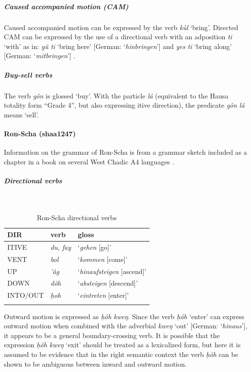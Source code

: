 \subparagraph{Caused accompanied motion (CAM)}



Caused accompanied motion can be expressed by the verb \textit{kùl} `bring'. Directed CAM can be expressed by the use of a directional verb with an adposition \textit{ti} `with' as in: \textit{yû ti} `bring here' [German: `\textit{hinbringen}'] and \textit{yes ti} `bring along' [German: `\textit{mitbringen}'] \citep[43]{seibertRonDaffoJosPlateau1998}. 

\subparagraph{Buy-sell verbs}



The verb \textit{gôn} is glossed `buy'. With the particle \textit{lá} (equivalent to the Hausa totality form ``Grade 4'', but also expressing itive direction), the predicate \textit{gôn lá} means `sell'. 

\paragraph*{Ron-Scha (shaa1247)} \label{shaa}

Information on the grammar of Ron-Scha is from a grammar sketch included as a chapter in a book on several West Chadic A4 languages \citep{jungraithmayrRonSprachenTaschadohamitischeStudien1970}.

\subparagraph{Directional verbs}~



\begin{table}[H]
	\caption{Ron-Scha directional verbs} 
	\label{tab:shaaV}
	\begin{tabular}{lll} %
		\lsptoprule
		DIR & verb & gloss   \\ %
		\midrule
		ITIVE & \textit{du, fay} & `\textit{gehen} [go]' \\
		VENT & \textit{bol} & `\textit{kommen} [come]' \\
		UP & \textit{'âg} & `\textit{hinaufsteigen} [ascend]' \\
		DOWN & \textit{dôh} & `\textit{absteigen} [descend]' \\
		INTO/OUT & \textit{ḥoh} & `\textit{eintreten} [enter]' \\
		\lspbottomrule
	\end{tabular}
\end{table}

Outward motion is expressed as \textit{ḥóh kweŋ}. Since the verb \textit{ḥóh} `enter' can express outward motion when combined with the adverbial \textit{kweŋ} `out' [German: `\textit{hinaus}'], it appears to be a general boundary-crossing verb. It is possible that the expression \textit{ḥóh kweŋ} `exit' should be treated as a lexicalized form, but here it is assumed to be evidence that in the right semantic context the verb \textit{ḥóh} can be shown to be ambiguous between inward and outward motion.

